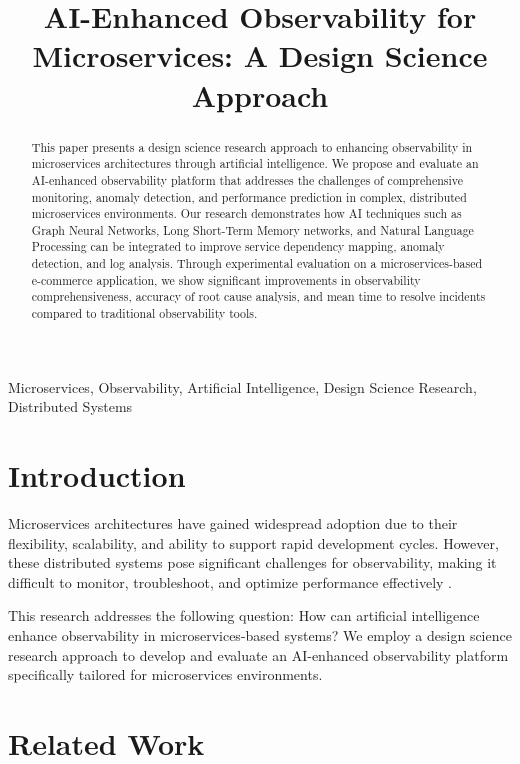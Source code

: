 \documentclass[10pt,journal,compsoc]{IEEEtran}
\begin{document}
\title{AI-Enhanced Observability for Microservices: A Design Science Approach}

\author{
}

\maketitle

\begin{abstract}
This paper presents a design science research approach to enhancing observability in microservices architectures through artificial intelligence. We propose and evaluate an AI-enhanced observability platform that addresses the challenges of comprehensive monitoring, anomaly detection, and performance prediction in complex, distributed microservices environments. Our research demonstrates how AI techniques such as Graph Neural Networks, Long Short-Term Memory networks, and Natural Language Processing can be integrated to improve service dependency mapping, anomaly detection, and log analysis. Through experimental evaluation on a microservices-based e-commerce application, we show significant improvements in observability comprehensiveness, accuracy of root cause analysis, and mean time to resolve incidents compared to traditional observability tools.
\end{abstract}

\begin{IEEEkeywords}
Microservices, Observability, Artificial Intelligence, Design Science Research, Distributed Systems
\end{IEEEkeywords}

\section{Introduction}
Microservices architectures have gained widespread adoption due to their flexibility, scalability, and ability to support rapid development cycles. However, these distributed systems pose significant challenges for observability, making it difficult to monitor, troubleshoot, and optimize performance effectively \cite{ref1}.

This research addresses the following question: How can artificial intelligence enhance observability in microservices-based systems? We employ a design science research approach to develop and evaluate an AI-enhanced observability platform specifically tailored for microservices environments.

\section{Related Work}
\end{document}
